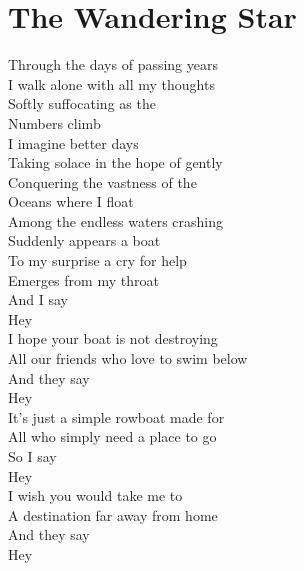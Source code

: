 \documentclass[12pt]{ctexart}
\begin{document}
	
	\section*{The Wandering Star}
	
	\hspace{1em}
	
	\begin{paracol}{2}
		
		\begin{leftcolumn*}
			
			Through the days of passing years\\
			I walk alone with all my thoughts\\
			Softly suffocating as the\\
			Numbers climb\\
			I imagine better days\\
			Taking solace in the hope of gently\\
			Conquering the vastness of the\\
			Oceans where I float\\
			Among the endless waters crashing\\
			Suddenly appears a boat\\
			To my surprise a cry for help\\
			Emerges from my throat\\
			And I say\\
			Hey\\
			
			I hope your boat is not destroying\\
			All our friends who love to swim below\\
			And they say\\
			Hey\\
			
			It's just a simple rowboat made for\\
			All who simply need a place to go\\
			So I say\\
			Hey\\
			
			I wish you would take me to\\
			A destination far away from home\\
			And they say\\
			Hey\\
			

\end{leftcolumn*}
\end{paracol}
\end{document}
